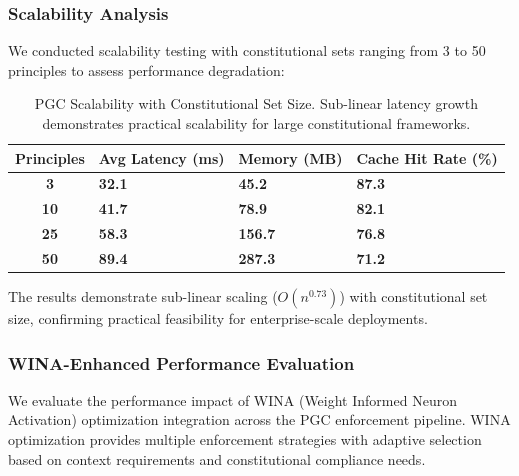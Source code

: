 \documentclass[manuscript,screen,review,anonymous,9pt]{acmart}
\newcommand{\tablesize}{\tiny}
\newcommand{\tablenumfmt}[1]{\textbf{#1}}
\newcommand{\tableheader}[1]{\textbf{#1}}
\begin{document}
\subsubsection{Scalability Analysis}
We conducted scalability testing with constitutional sets ranging from 3 to 50 principles to assess performance degradation:

\begin{table}[htbp]
  \centering
  \caption{PGC Scalability with Constitutional Set Size. Sub-linear latency growth demonstrates practical scalability for large constitutional frameworks.}
  \label{tab:pgc_scalability}
  \tablesize
  \begin{tabular}{@{}c>{\centering\arraybackslash}p{1.8cm}>{\centering\arraybackslash}p{1.6cm}>{\centering\arraybackslash}p{1.8cm}@{}}
    \toprule
    \tableheader{Principles} & \tableheader{Avg Latency (ms)} & \tableheader{Memory (MB)} & \tableheader{Cache Hit Rate (\%)} \\
    \midrule
    \tablenumfmt{3}  & \tablenumfmt{32.1} & \tablenumfmt{45.2}  & \tablenumfmt{87.3} \\
    \tablenumfmt{10} & \tablenumfmt{41.7} & \tablenumfmt{78.9}  & \tablenumfmt{82.1} \\
    \tablenumfmt{25} & \tablenumfmt{58.3} & \tablenumfmt{156.7} & \tablenumfmt{76.8} \\
    \tablenumfmt{50} & \tablenumfmt{89.4} & \tablenumfmt{287.3} & \tablenumfmt{71.2} \\
    \bottomrule
  \end{tabular}
\end{table}

The results demonstrate sub-linear scaling ($O(n^{0.73})$) with constitutional set size, confirming practical feasibility for enterprise-scale deployments.

\subsubsection{WINA-Enhanced Performance Evaluation}
\label{subsubsec:wina_performance_evaluation}
We evaluate the performance impact of WINA (Weight Informed Neuron Activation) optimization integration across the PGC enforcement pipeline. WINA optimization provides multiple enforcement strategies with adaptive selection based on context requirements and constitutional compliance needs.
\end{document}
